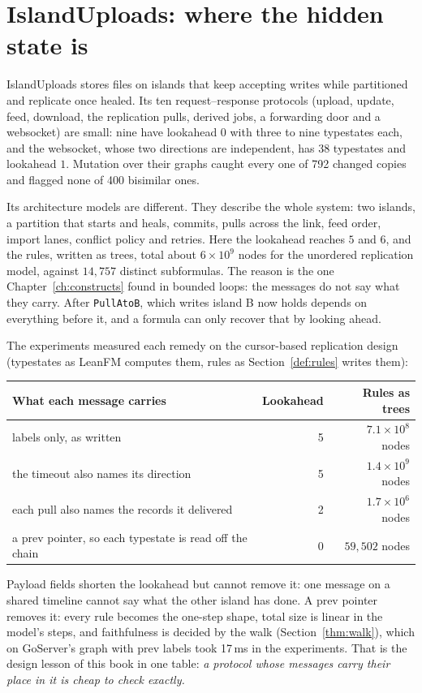 \section{IslandUploads: where the hidden state is}

IslandUploads stores files on islands that keep accepting writes while partitioned and
replicate once healed. Its ten request--response protocols (upload, update, feed,
download, the replication pulls, derived jobs, a forwarding door and a websocket) are
small: nine have lookahead $0$ with three to nine typestates each, and the websocket,
whose two directions are independent, has 38 typestates and lookahead $1$. Mutation
over their graphs caught every one of 792 changed copies and flagged none of 400
bisimilar ones.

Its architecture models are different. They describe the whole system: two islands, a
partition that starts and heals, commits, pulls across the link, feed order, import
lanes, conflict policy and retries. Here the lookahead reaches $5$ and $6$, and the
rules, written as trees, total about $6\times 10^9$ nodes for the unordered
replication model, against $14{,}757$ distinct subformulas. The reason is the one
Chapter~\ref{ch:constructs} found in bounded loops: the messages do not say what they
carry. After \texttt{PullAtoB}, which writes island B now holds depends on everything
before it, and a formula can only recover that by looking ahead.

The experiments measured each remedy on the cursor-based replication design
(typestates as LeanFM computes them, rules as Section~\ref{def:rules} writes them):

\begin{center}
\begin{tabular}{@{}lrr@{}}
\toprule
What each message carries & Lookahead & Rules as trees \\
\midrule
labels only, as written & 5 & $7.1\times 10^{8}$ nodes \\
the timeout also names its direction & 5 & $1.4\times 10^{9}$ nodes \\
each pull also names the records it delivered & 2 & $1.7\times 10^{6}$ nodes \\
a prev pointer, so each typestate is read off the chain & 0 & $59{,}502$ nodes \\
\bottomrule
\end{tabular}
\end{center}

\noindent Payload fields shorten the lookahead but cannot remove it: one message on a
shared timeline cannot say what the other island has done. A prev pointer removes it:
every rule becomes the one-step shape, total size is linear in the model's steps, and
faithfulness is decided by the walk (Section~\ref{thm:walk}), which on GoServer's graph
with prev labels took 17\,ms in the experiments. That is the design lesson of this book
in one table: \emph{a protocol whose messages carry their place in it is cheap to check
exactly.}

